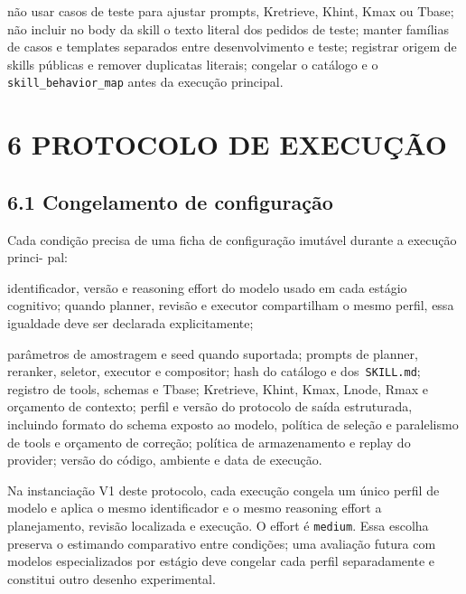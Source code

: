 \documentclass[12pt,a4paper]{article}
\begin{document}
\noindent \textbullet{} não usar casos de teste para ajustar prompts, Kretrieve, Khint, Kmax ou Tbase; \textbullet{} não incluir no body da skill o texto literal dos pedidos de teste; \textbullet{} manter famílias de casos e templates separados entre desenvolvimento e teste; \textbullet{} registrar origem de skills públicas e remover duplicatas literais; \textbullet{} congelar o catálogo e o\texttt{ skill\_behavior\_map} antes da execução principal.\par

\section*{6 PROTOCOLO DE EXECUÇÃO}

\subsection*{6.1 Congelamento de configuração}

Cada condição precisa de uma ficha de configuração imutável durante a execução princi- pal:


\noindent \textbullet{} identificador, versão e reasoning effort do modelo usado em cada estágio cognitivo; quando planner, revisão e executor compartilham o mesmo perfil, essa igualdade deve ser declarada explicitamente;\par


\noindent \textbullet{} parâmetros de amostragem e seed quando suportada; \textbullet{} prompts de planner, reranker, seletor, executor e compositor; \textbullet{} hash do catálogo e dos\texttt{ SKILL.md}; \textbullet{} registro de tools, schemas e Tbase; \textbullet{} Kretrieve, Khint, Kmax, Lnode, Rmax e orçamento de contexto; \textbullet{} perfil e versão do protocolo de saída estruturada, incluindo formato do schema exposto ao modelo, política de seleção e paralelismo de tools e orçamento de correção; \textbullet{} política de armazenamento e replay do provider; \textbullet{} versão do código, ambiente e data de execução.\par

Na instanciação V1 deste protocolo, cada execução congela um único perfil de modelo e aplica o mesmo identificador e o mesmo reasoning effort a planejamento, revisão localizada e execução. O effort é \texttt{medium}. Essa escolha preserva o estimando comparativo entre condições; uma avaliação futura com modelos especializados por estágio deve congelar cada perfil separadamente e constitui outro desenho experimental.
\end{document}
